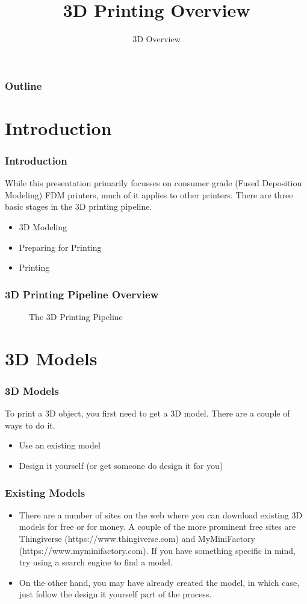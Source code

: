 \documentclass[english,10pt]{beamer}
\title{3D Printing Overview}
\subtitle{3D Overview}
\begin{document}
\begin{frame}
  \titlepage
\end{frame}

\begin{frame}
  \frametitle{Outline}
  \tableofcontents
\end{frame}

\section{Introduction}
\begin{frame}
  \frametitle{Introduction}
  While this presentation primarily focusses on consumer grade (Fused Deposition Modeling) FDM printers, much of it applies to other printers.  There are three basic stages in the 3D printing pipeline.
  \begin{itemize}
    \item 3D Modeling
    \item Preparing for Printing
    \item Printing
  \end{itemize}
\end{frame}

\begin{frame}
  \frametitle{3D Printing Pipeline Overview}
  \begin{figure}
    
    \caption{The 3D Printing Pipeline}
  \end{figure}
\end{frame}

\section{3D Models}
\begin{frame}
  \frametitle{3D Models}
  To print a 3D object, you first need to get a 3D model.  There are a couple of ways to do it.
  \begin{itemize}
    \item Use an existing model
    \item Design it yourself (or get someone do design it for you)
  \end{itemize}
\end{frame}

\begin{frame}
  \frametitle{Existing Models}
  \begin{itemize}
    \item There are a number of sites on the web where you can download existing 3D models for free or for money.  A couple of the more prominent free sites are Thingiverse (https://www.thingiverse.com) and MyMiniFactory (https://www.myminifactory.com).  If you have something specific in mind, try using a search engine to find a model.

    \item  On the other hand, you may have already created the model, in which case, just follow the design it yourself part of the process.
  \end{itemize}
\end{frame}
\end{document}
